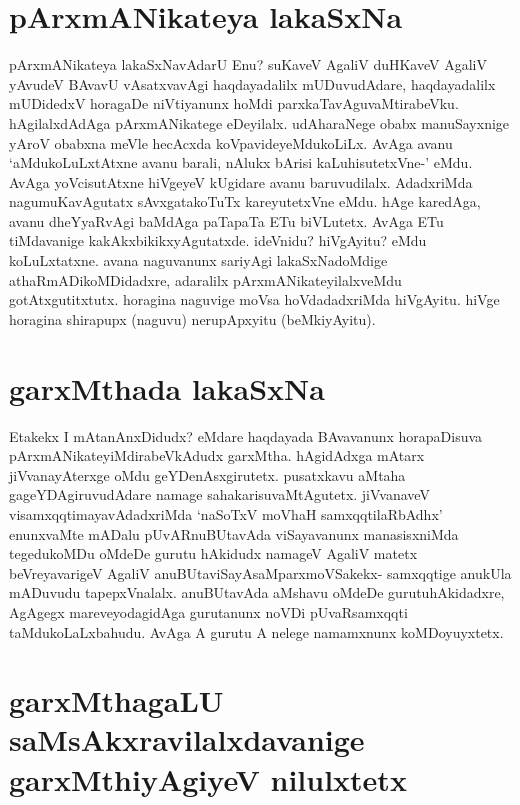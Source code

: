 \section*{pArxmANikateya lakaSxNa}

pArxmANikateya lakaSxNavAdarU Enu? suKaveV AgaliV duHKaveV AgaliV yAvudeV BAvavU vAsatxvavAgi haqdayadalilx mUDuvudAdare, haqdayadalilx mUDidedxV horagaDe niVtiyanunx hoMdi parxkaTavAguvaMtirabeVku. hAgilalxdAdAga pArxmANikatege eDeyilalx. udAharaNege obabx manuSayxnige yAroV obabxna meVle hecAcxda koVpavideyeMdukoLiLx. AvAga avanu `aMdukoLuLxtAtxne avanu barali, nAlukx bArisi kaLuhisutetxVne-' eMdu. AvAga yoVcisutAtxne hiVgeyeV kUgidare avanu baruvudilalx. AdadxriMda nagumuKavAgutatx sAvxgatakoTuTx kareyutetxVne eMdu. hAge karedAga, avanu dheYyaRvAgi baMdAga paTapaTa ETu biVLutetx. AvAga ETu tiMdavanige kakAkxbikikxyAgutatxde. ideVnidu? hiVgAyitu? eMdu koLuLxtatxne. avana naguvanunx sariyAgi lakaSxNadoMdige athaRmADikoMDidadxre, adaralilx pArxmANikateyilalxveMdu gotAtxgutitxtutx. horagina naguvige moVsa hoVdadadxriMda hiVgAyitu. hiVge horagina shirapupx (naguvu) nerupApxyitu (beMkiyAyitu).

\section*{garxMthada lakaSxNa}

Etakekx I mAtanAnxDidudx? eMdare haqdayada BAvavanunx horapaDisuva pArxmANikateyiMdirabeVkAdudx garxMtha. hAgidAdxga mAtarx jiVvanayAterxge oMdu geYDenAsxgirutetx. pusatxkavu aMtaha gageYDAgiruvudAdare namage sahakarisuvaMtAgutetx. jiVvanaveV visamxqqtimayavAdadxriMda `naSoTxV moVhaH samxqqtilaRbAdhx'\label{104} enunxvaMte mADalu pUvARnuBUtavAda viSayavanunx manasisxniMda tegedukoMDu oMdeDe gurutu hAkidudx namageV AgaliV matetx beVreyavarigeV AgaliV anuBUtaviSayAsaMparxmoVSakekx- samxqqtige anukUla mADuvudu tapepxVnalalx. anuBUtavAda aMshavu oMdeDe gurutuhAkidadxre, AgAgegx mareveyodagidAga gurutanunx noVDi pUvaRsamxqqti taMdukoLaLxbahudu. AvAga A gurutu A nelege namamxnunx koMDoyuyxtetx. 

\section*{garxMthagaLU saMsAkxravilalxdavanige garxMthiyAgiyeV nilulxtetx}

